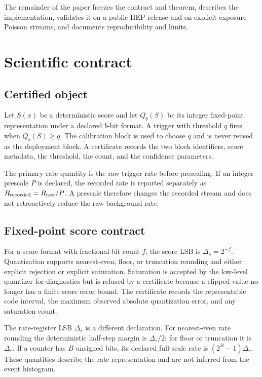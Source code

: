\documentclass[submission, Phys]{SciPost}
\begin{document}
The remainder of the paper freezes the contract and theorem, describes the
implementation, validates it on a public HEP release and on explicit-exposure
Poisson streams, and documents reproducibility and limits.

\section{Scientific contract}
\label{sec:contract}

\subsection{Certified object}

Let $S(x)$ be a deterministic score and let $Q_b(S)$ be its integer fixed-point
representation under a declared $b$-bit format.  A trigger with threshold $q$
fires when $Q_b(S)\ge q$.  The calibration block is used to choose $q$ and is
never reused as the deployment block.  A certificate records the two block
identifiers, score metadata, the threshold, the count, and the confidence
parameters.

The primary rate quantity is the raw trigger rate before prescaling.  If an
integer prescale $P$ is declared, the recorded rate is reported separately as
$R_{\rm recorded}=R_{\rm raw}/P$.  A prescale therefore changes the recorded
stream and does not retroactively reduce the raw background rate.

\subsection{Fixed-point score contract}

For a score format with fractional-bit count $f$, the score LSB is
$\Delta_s=2^{-f}$.  Quantization supports nearest-even, floor, or truncation
rounding and either explicit rejection or explicit saturation.  Saturation is
accepted by the low-level quantizer for diagnostics but is refused by a
certificate because a clipped value no longer has a finite score error bound.
The certificate records the representable code interval, the maximum observed
absolute quantization error, and any saturation count.

The rate-register LSB $\Delta_r$ is a different declaration.  For nearest-even
rate rounding the deterministic half-step margin is $\Delta_r/2$; for floor or
truncation it is $\Delta_r$.  If a counter has $B$ unsigned bits, its declared
full-scale rate is $(2^B-1)\Delta_r$.  These quantities describe the rate
representation and are not inferred from the event histogram.
\end{document}
